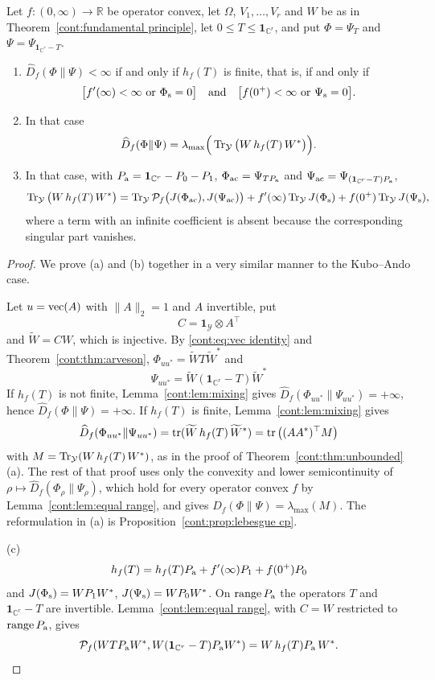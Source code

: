 \begin{theorem}\label{cont:thm:all f}
Let $f:(0,\infty)\to\mathbb{R}$ be operator convex, let $\Omega$, $V_1,\dots,V_r$ and $W$ be as in Theorem~\ref{cont:fundamental principle}, let $0\leq T\leq\mathbf{1}_{\mathbb{C}^r}$, and put $\Phi=\Psi_T$ and $\Psi=\Psi_{\mathbf{1}_{\mathbb{C}^r}-T}$.
\begin{enumerate}
\item[(a)] $\widehat{D}_f(\Phi\|\Psi)<\infty$ if and only if $h_f(T)$ is finite, that is, if and only if
\[
\big[f'(\infty)<\infty\ \text{or}\ \Phi_{\rm s}=0\big]\quad\text{and}\quad\big[f(0^+)<\infty\ \text{or}\ \Psi_{\rm s}=0\big].
\]
\item[(b)] In that case
\[
\widehat{D}_f(\Phi\|\Psi)=\lambda_{\max}\Big(\operatorname{Tr}_{\mathcal{Y}}\big(W\,h_f(T)\,W^*\big)\Big).
\]
\item[(c)] In that case, with $P_{\rm a}=\mathbf{1}_{\mathbb{C}^r}-P_0-P_1$, $\Phi_{\rm ac}=\Psi_{TP_{\rm a}}$ and $\Psi_{\rm ac}=\Psi_{(\mathbf{1}_{\mathbb{C}^r}-T)P_{\rm a}}$,
\[
\operatorname{Tr}_{\mathcal{Y}}\big(W\,h_f(T)\,W^*\big)=\operatorname{Tr}_{\mathcal{Y}}\mathcal{P}_f\big(J(\Phi_{\rm ac}),J(\Psi_{\rm ac})\big)+f'(\infty)\operatorname{Tr}_{\mathcal{Y}}J(\Phi_{\rm s})+f(0^+)\operatorname{Tr}_{\mathcal{Y}}J(\Psi_{\rm s}),
\]
where a term with an infinite coefficient is absent because the corresponding singular part vanishes.
\end{enumerate}
\end{theorem}

\begin{proof}
We prove (a) and (b) together in a very similar manner to the Kubo--Ando case.

Let $u=\operatorname{vec}(A)$ with $\|A\|_2=1$ and $A$ invertible, put \[C=\mathbf{1}_{\mathcal{Y}}\otimes A^\top\] and $\widetilde{W}=CW$, which is injective. By \eqref{cont:eq:vec identity} and Theorem~\ref{cont:thm:arveson}, $\Phi_{uu^*}=\widetilde{W}T\widetilde{W}^*$ and \[\Psi_{uu^*}=\widetilde{W}(\mathbf{1}_{\mathbb{C}^r}-T)\widetilde{W}^*\] If $h_f(T)$ is not finite, Lemma~\ref{cont:lem:mixing} gives $\widehat{D}_f(\Phi_{uu^*}\|\Psi_{uu^*})=+\infty$, hence $\widehat{D}_f(\Phi\|\Psi)=+\infty$. If $h_f(T)$ is finite, Lemma~\ref{cont:lem:mixing} gives \[\widehat{D}_f(\Phi_{uu^*}\|\Psi_{uu^*})=\operatorname{tr}(\widetilde{W}\,h_f(T)\,\widetilde{W}^*)=\operatorname{tr}\big((AA^*)^\top M\big)\] with $M=\operatorname{Tr}_{\mathcal{Y}}(W\,h_f(T)\,W^*)$, as in the proof of Theorem~\ref{cont:thm:unbounded}(a). The rest of that proof uses only the convexity and lower semicontinuity of $\rho\mapsto\widehat{D}_f(\Phi_\rho\|\Psi_\rho)$, which hold for every operator convex $f$ by Lemma~\ref{cont:lem:equal range}, and gives $\widehat{D}_f(\Phi\|\Psi)=\lambda_{\max}(M)$. The reformulation in (a) is Proposition~\ref{cont:prop:lebesgue cp}.

(c) \[h_f(T)=h_f(T)P_{\rm a}+f'(\infty)P_1+f(0^+)P_0\] and $J(\Phi_{\rm s})=WP_1W^*$, $J(\Psi_{\rm s})=WP_0W^*$. On $\operatorname{range} P_{\rm a}$ the operators $T$ and $\mathbf{1}_{\mathbb{C}^r}-T$ are invertible. Lemma~\ref{cont:lem:equal range}, with $C=W$ restricted to $\operatorname{range} P_{\rm a}$, gives
\[
\mathcal{P}_f(WTP_{\rm a}W^*,W(\mathbf{1}_{\mathbb{C}^r}-T)P_{\rm a}W^*)=W\,h_f(T)P_{\rm a}\,W^*.
\]
\end{proof}

